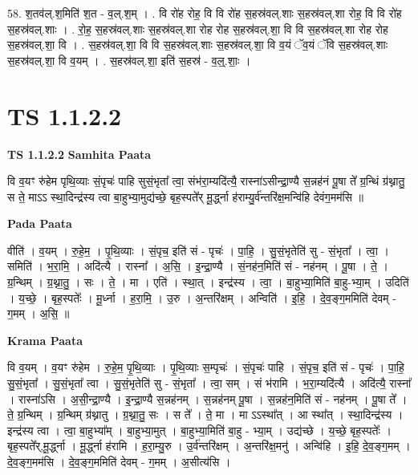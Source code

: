 \documentclass[17pt]{extarticle}
\begin{document}
58. श॒तव॑ल्.श॒मिति॑ श॒त - व॒ल्.श॒म् । . वि रो॑ह रोह॒ वि वि रो॑ह स॒हस्र॑वल्.शाः स॒हस्र॑वल्.शा रोह॒ वि वि रो॑ह स॒हस्र॑वल्.शाः । . रो॒ह॒ स॒हस्र॑वल्.शाः स॒हस्र॑वल्.शा रोह रोह स॒हस्र॑वल्.शा॒ वि वि स॒हस्र॑वल्.शा रोह रोह स॒हस्र॑वल्.शा॒ वि । . स॒हस्र॑वल्.शा॒ वि वि स॒हस्र॑वल्.शाः स॒हस्र॑वल्.शा॒ वि व॒यं ॅव॒यं ॅवि स॒हस्र॑वल्.शाः स॒हस्र॑वल्.शा॒ वि व॒यम् । . स॒हस्र॑वल्.शा॒ इति॑ स॒हस्र॑ - व॒ल्॒.शाः॒ । \newline
\pagebreak
{}
\section*{ TS 1.1.2.2 }

\textbf{TS 1.1.2.2 } \newline
\textbf{Samhita Paata} \newline

वि व॒यꣳ रु॑हेम पृथि॒व्याः सं॒पृचः॑ पाहि सुसं॒भृता᳚ त्वा॒ संभ॑रा॒म्यदि॑त्यै॒ रास्ना॑ऽसीन्द्रा॒ण्यै स॒न्नह॑नं पू॒षा ते᳚ ग्र॒न्थिं ग्र॑थ्नातु॒ स ते॒ माऽऽ स्था॒दिन्द्र॑स्य त्वा बा॒हुभ्या॒मुद्य॑च्छे॒ बृह॒स्पते᳚र् मू॒र्द्ध्ना ह॑राम्यु॒र्व॑न्तरि॑क्ष॒मन्वि॑हि देवंग॒मम॑सि ॥ \newline

\textbf{Pada Paata} \newline

वीति॑ । व॒यम् । रु॒हे॒म॒ । पृ॒थि॒व्याः । सं॒पृच॒ इति॑ सं - पृचः॑ । पा॒हि॒ । सु॒सं॒भृतेति॑ सु - सं॒भृता᳚ । त्वा॒ । समिति॑ । भ॒रा॒मि॒ । अदि॑त्यै । रास्ना᳚ । अ॒सि॒ । इ॒न्द्रा॒ण्यै । सं॒नह॑न॒मिति॑ सं - नह॑नम् । पू॒षा । ते॒ । ग्र॒न्थिम् । ग्र॒थ्ना॒तु॒ । सः । ते॒ । मा । एति॑ । स्था॒त् । इन्द्र॑स्य । त्वा॒ । बा॒हुभ्या॒मिति॑ बा॒हु-भ्या॒म् । उदिति॑ । य॒च्छे॒ । बृह॒स्पतेः᳚ । मू॒र्ध्ना । ह॒रा॒मि॒ । उ॒रु । अ॒न्तरि॑क्षम् । अन्विति॑ । इ॒हि॒ । दे॒व॒ङ्ग॒ममिति॑ देवम् - ग॒मम् । अ॒सि॒ ॥  \newline


\textbf{Krama Paata} \newline

वि व॒यम् । व॒यꣳ रु॑हेम । रु॒हे॒म॒ पृ॒थि॒व्याः । पृ॒थि॒व्याः स॒म्पृचः॑ । सं॒पृचः॑ पाहि । सं॒पृच॒ इति॑ सं - पृचः॑ । पा॒हि॒ सु॒सं॒भृता᳚ । सु॒सं॒भृता᳚ त्वा । सु॒सं॒भृतेति॑ सु - सं॒भृता᳚ । त्वा॒ सम् । सं भ॑रामि । भ॒रा॒म्यदि॑त्यै । अदि॑त्यै॒ रास्ना᳚ । रास्ना॑ऽसि । अ॒सी॒न्द्रा॒ण्यै । इ॒न्द्रा॒ण्यै स॒न्नह॑नम् । स॒न्नह॑नम् पू॒षा । स॒न्नह॑न॒मिति॑ सं - नह॑नम् । पू॒षा ते᳚ । ते॒ ग्र॒न्थिम् । ग्र॒न्थिम् ग्र॑थ्नातु । ग्र॒थ्ना॒तु॒ सः । स ते᳚ । ते॒ मा । मा ऽऽस्था᳚त् । आ स्था᳚त् । स्था॒दिन्द्र॑स्य । इन्द्र॑स्य त्वा । त्वा॒ बा॒हुभ्या᳚म् । बा॒हुभ्या॒मुत् । बा॒हुभ्या॒मिति॑ बा॒हु - भ्या॒म् । उद्य॑च्छे । य॒च्छे॒ बृह॒स्पतेः᳚ । बृह॒स्पते᳚र्,मू॒र्द्ध्ना । मू॒र्द्ध्ना ह॑रामि । ह॒रा॒म्यु॒रु । उ॒र्व॑न्तरि॑क्षम् । अ॒न्तरि॑क्ष॒मनु॑ । अन्वि॑हि । इ॒हि॒ दे॒व॒ङ्ग॒मम् । दे॒व॒ङ्ग॒मम॑सि । दे॒व॒ङ्ग॒ममिति॑ देवम् - ग॒मम् । अ॒सीत्य॑सि । \newline
\end{document}
